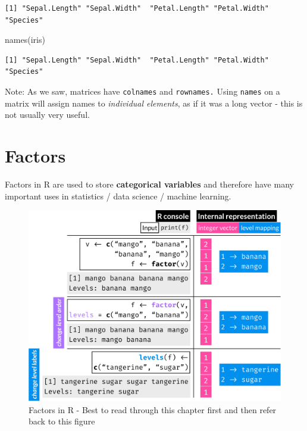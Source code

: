 \documentclass[
]{book}
\newenvironment{Shaded}{\begin{snugshade}}{\end{snugshade}}
\newcommand{\FunctionTok}[1]{\textcolor[rgb]{0.00,0.00,0.00}{#1}}
\newcommand{\NormalTok}[1]{#1}
\begin{document}
\begin{verbatim}
[1] "Sepal.Length" "Sepal.Width"  "Petal.Length" "Petal.Width"  "Species"     
\end{verbatim}

\begin{Shaded}
\begin{Highlighting}[]
\FunctionTok{names}\NormalTok{(iris)}
\end{Highlighting}
\end{Shaded}

\begin{verbatim}
[1] "Sepal.Length" "Sepal.Width"  "Petal.Length" "Petal.Width"  "Species"     
\end{verbatim}

Note: As we saw, matrices have \texttt{colnames} and \texttt{rownames.} Using \texttt{names} on a matrix will assign names to \emph{individual elements}, as if it was a long vector - this is not usually very useful.

\hypertarget{factors}{%
\chapter{Factors}\label{factors}}

Factors in R are used to store \textbf{categorical variables} and therefore have many important uses in statistics / data science / machine learning.

\begin{figure}

{\centering \includegraphics[width=0.8\linewidth]{./R_factors} 

}

\caption{Factors in R - Best to read through this chapter first and then refer back to this figure}\label{fig:FigRFactors}
\end{figure}
\end{document}
